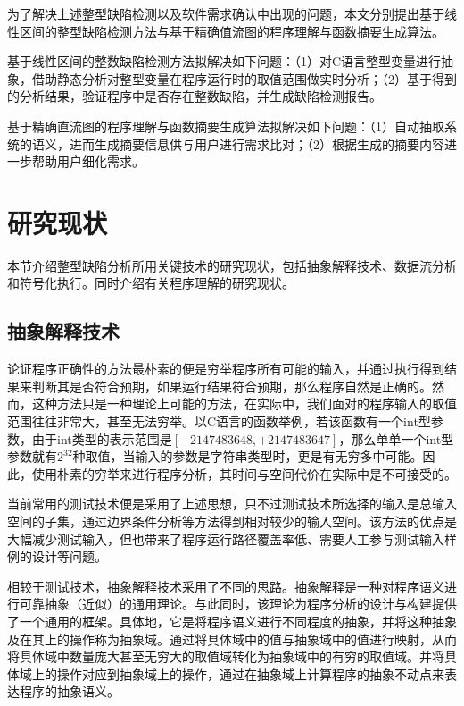 为了解决上述整型缺陷检测以及软件需求确认中出现的问题，本文分别提出基于线性区间的整型缺陷检测方法与基于精确值流图的程序理解与函数摘要生成算法。

基于线性区间的整数缺陷检测方法拟解决如下问题：（1）对C语言整型变量进行抽象，借助静态分析对整型变量在程序运行时的取值范围做实时分析；（2）基于得到的分析结果，验证程序中是否存在整数缺陷，并生成缺陷检测报告。

基于精确直流图的程序理解与函数摘要生成算法拟解决如下问题：（1）自动抽取系统的语义，进而生成摘要信息供与用户进行需求比对；（2）根据生成的摘要内容进一步帮助用户细化需求。

 \section{研究现状}
 
 本节介绍整型缺陷分析所用关键技术的研究现状，包括抽象解释技术、数据流分析和符号化执行。同时介绍有关程序理解的研究现状。
 
 \subsection{抽象解释技术}
 
 论证程序正确性的方法最朴素的便是穷举程序所有可能的输入，并通过执行得到结果来判断其是否符合预期，如果运行结果符合预期，那么程序自然是正确的。然而，这种方法只是一种理论上可能的方法，在实际中，我们面对的程序输入的取值范围往往非常大，甚至无法穷举。以C语言的函数举例，若该函数有一个int型参数，由于int类型的表示范围是$ \left[  -2147483648, +2147483647 \right] $，那么单单一个int型参数就有$ 2^{32}  $种取值，当输入的参数是字符串类型时，更是有无穷多中可能。因此，使用朴素的穷举来进行程序分析，其时间与空间代价在实际中是不可接受的。
 
 当前常用的测试技术便是采用了上述思想，只不过测试技术所选择的输入是总输入空间的子集，通过边界条件分析等方法得到相对较少的输入空间。该方法的优点是大幅减少测试输入，但也带来了程序运行路径覆盖率低、需要人工参与测试输入样例的设计等问题。
 
 相较于测试技术，抽象解释技术采用了不同的思路。抽象解释是一种对程序语义进行可靠抽象（近似）的通用理论\cite{cousot1977abstract}。与此同时，该理论为程序分析的设计与构建提供了一个通用的框架\cite{cousot1979systematic}。具体地，它是将程序语义进行不同程度的抽象，并将这种抽象及在其上的操作称为抽象域。通过将具体域中的值与抽象域中的值进行映射，从而将具体域中数量庞大甚至无穷大的取值域转化为抽象域中的有穷的取值域。并将具体域上的操作对应到抽象域上的操作，通过在抽象域上计算程序的抽象不动点来表达程序的抽象语义。
 

